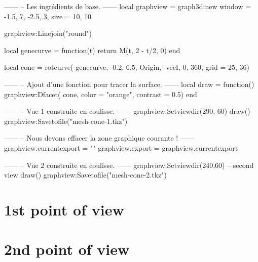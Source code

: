\documentclass[varwidth, border = 3pt]{standalone}
\begin{document}
\begin{luadraw}{}
------
-- Les ingrédients de base.
------
    local graphview = graph3d:new{
        window = {-1.5, 7, -2.5, 3},
        size   = {10, 10}
    }

    graphview:Linejoin("round")

    local genecurve = function(t)
        return M(t, 2 - t/2, 0)
    end

    local cone = rotcurve(
        genecurve, -0.2, 6.5,
        {Origin, -vecI},
        0, 360,
        {grid = {25, 36}})

------
-- Ajout d'une fonction pour tracer la surface.
------
    local draw = function()
        graphview:Dfacet(
            cone,
            {color    = "orange",
             contrast = 0.5})
    end

------
-- Vue 1 construite en coulisse.
------
    graphview:Setviewdir(290, 60)
    draw()
    graphview:Savetofile("mesh-cone-1.tkz")

------
-- Nous devons effacer la zone graphique courante !
------
    graphview.currentexport = {""}
    graphview.export        = graphview.currentexport

------
-- Vue 2 construite en coulisse.
------
    graphview:Setviewdir(240,60) -- second view
    draw()
    graphview:Savetofile("mesh-cone-2.tkz")
\end{luadraw}

\section*{1st point of view}




\section*{2nd point of view}


\end{document}
